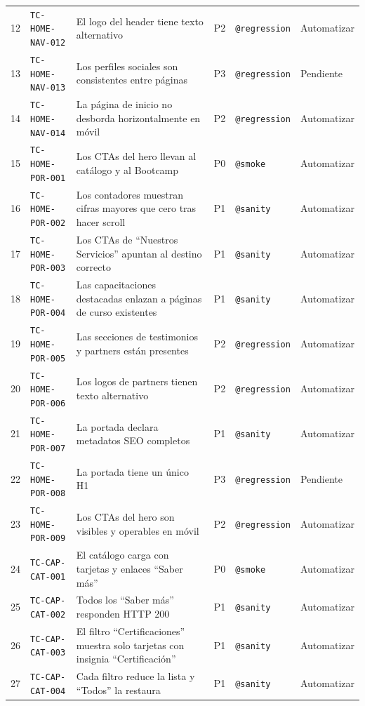 \documentclass[11pt,a4paper]{article}
\newcommand{\tcid}[1]{\texttt{#1}}
\begin{document}
{\begin{xltabular}{\textwidth}{@{}r l X c l l@{}}
12 & \tcid{TC-HOME-NAV-012} & El logo del header tiene texto alternativo & P2 & \texttt{@regression} & Automatizar \\
13 & \tcid{TC-HOME-NAV-013} & Los perfiles sociales son consistentes entre páginas & P3 & \texttt{@regression} & Pendiente \\
14 & \tcid{TC-HOME-NAV-014} & La página de inicio no desborda horizontalmente en móvil & P2 & \texttt{@regression} & Automatizar \\
15 & \tcid{TC-HOME-POR-001} & Los CTAs del hero llevan al catálogo y al Bootcamp & P0 & \texttt{@smoke} & Automatizar \\
16 & \tcid{TC-HOME-POR-002} & Los contadores muestran cifras mayores que cero tras hacer scroll & P1 & \texttt{@sanity} & Automatizar \\
17 & \tcid{TC-HOME-POR-003} & Los CTAs de ``Nuestros Servicios'' apuntan al destino correcto & P1 & \texttt{@sanity} & Automatizar \\
18 & \tcid{TC-HOME-POR-004} & Las capacitaciones destacadas enlazan a páginas de curso existentes & P1 & \texttt{@sanity} & Automatizar \\
19 & \tcid{TC-HOME-POR-005} & Las secciones de testimonios y partners están presentes & P2 & \texttt{@regression} & Automatizar \\
20 & \tcid{TC-HOME-POR-006} & Los logos de partners tienen texto alternativo & P2 & \texttt{@regression} & Automatizar \\
21 & \tcid{TC-HOME-POR-007} & La portada declara metadatos SEO completos & P1 & \texttt{@sanity} & Automatizar \\
22 & \tcid{TC-HOME-POR-008} & La portada tiene un único H1 & P3 & \texttt{@regression} & Pendiente \\
23 & \tcid{TC-HOME-POR-009} & Los CTAs del hero son visibles y operables en móvil & P2 & \texttt{@regression} & Automatizar \\
24 & \tcid{TC-CAP-CAT-001} & El catálogo carga con tarjetas y enlaces ``Saber más'' & P0 & \texttt{@smoke} & Automatizar \\
25 & \tcid{TC-CAP-CAT-002} & Todos los ``Saber más'' responden HTTP 200 & P1 & \texttt{@sanity} & Automatizar \\
26 & \tcid{TC-CAP-CAT-003} & El filtro ``Certificaciones'' muestra solo tarjetas con insignia ``Certificación'' & P1 & \texttt{@sanity} & Automatizar \\
27 & \tcid{TC-CAP-CAT-004} & Cada filtro reduce la lista y ``Todos'' la restaura & P1 & \texttt{@sanity} & Automatizar \\

\end{xltabular}}
\end{document}
